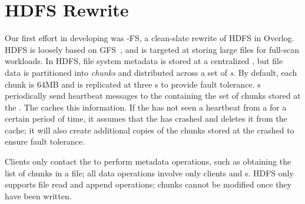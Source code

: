 


\section{HDFS Rewrite}
\label{sec:boom-fs}
Our first effort in developing \BOOMA was \BOOM-FS, a clean-slate rewrite of
HDFS in Overlog.  HDFS is loosely based on GFS~\cite{gfs-sosp}, and is targeted
at storing large files for full-scan workloads.  In HDFS, file system metadata
is stored at a centralized \emph{{\NN}}, but file data is partitioned into
\emph{chunks} and distributed across a set of \emph{{\DN}s}. By default, each
chunk is 64MB and is replicated at three {\DN}s to provide fault tolerance. {\DN}s
periodically send heartbeat messages to the {\NN} containing the set of chunks
stored at the {\DN}. The {\NN} caches this information. If the {\NN} has not
seen a heartbeat from a {\DN} for a certain period of time, it assumes that the
{\DN} has crashed and deletes it from the cache; it will also create additional
copies of the chunks stored at the crashed {\DN} to ensure fault tolerance.

Clients only contact the {\NN} to perform metadata operations, such as
obtaining the list of chunks in a file; all data operations involve
only clients and {\DN}s. HDFS only supports file read and append
operations; chunks cannot be modified once they have been written.




